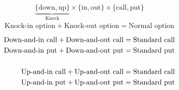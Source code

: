 \begin{frame}[fragile,t]
	\begin{align*}
		\underbrace{\{\text{down},\text{up}\}}_{\text{Knock}}  \times \{\text{in},\text{out}\} \times \{\text{call},\text{put}\}
	\end{align*}
	\bigskip
	\mySeparateLine
	\begin{align*}
		\text{Knock-in option} + \text{Knock-out option} = \text{Normal option}
	\end{align*}
	\mySeparateLine
	\bigskip
	\begin{align*}
		\text{Down-and-in call} + \text{Down-and-out call} & = \text{Standard call} \\
		\text{Down-and-in put} + \text{Down-and-out put}   & = \text{Standard put}  \\
                                                       & \bigskip               \\
		\text{Up-and-in call} + \text{Up-and-out call}     & = \text{Standard call} \\
		\text{Up-and-in put} + \text{Up-and-out put}       & = \text{Standard put}  \\
	\end{align*}
\end{frame}
